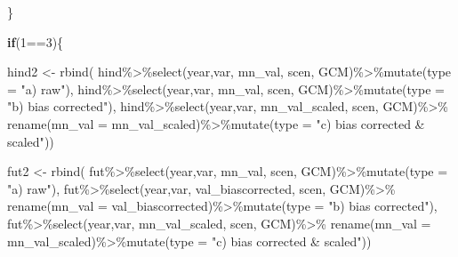 \documentclass[
]{article}
\newenvironment{Shaded}{\begin{snugshade}}{\end{snugshade}}
\newcommand{\AttributeTok}[1]{\textcolor[rgb]{0.77,0.63,0.00}{#1}}
\newcommand{\ControlFlowTok}[1]{\textcolor[rgb]{0.13,0.29,0.53}{\textbf{#1}}}
\newcommand{\DecValTok}[1]{\textcolor[rgb]{0.00,0.00,0.81}{#1}}
\newcommand{\FunctionTok}[1]{\textcolor[rgb]{0.00,0.00,0.00}{#1}}
\newcommand{\NormalTok}[1]{#1}
\newcommand{\OtherTok}[1]{\textcolor[rgb]{0.56,0.35,0.01}{#1}}
\newcommand{\SpecialCharTok}[1]{\textcolor[rgb]{0.00,0.00,0.00}{#1}}
\newcommand{\StringTok}[1]{\textcolor[rgb]{0.31,0.60,0.02}{#1}}
\begin{document}
\begin{Shaded}
\begin{Highlighting}[]
\NormalTok{    \}}
    
    \ControlFlowTok{if}\NormalTok{(}\DecValTok{1}\SpecialCharTok{==}\DecValTok{3}\NormalTok{)\{}
         
\NormalTok{          hind2 }\OtherTok{\textless{}{-}} \FunctionTok{rbind}\NormalTok{(}
\NormalTok{            hind}\SpecialCharTok{\%\textgreater{}\%}\FunctionTok{select}\NormalTok{(year,var, mn\_val, scen, GCM)}\SpecialCharTok{\%\textgreater{}\%}\FunctionTok{mutate}\NormalTok{(}\AttributeTok{type =} \StringTok{"a) raw"}\NormalTok{),}
\NormalTok{            hind}\SpecialCharTok{\%\textgreater{}\%}\FunctionTok{select}\NormalTok{(year,var, mn\_val, scen, GCM)}\SpecialCharTok{\%\textgreater{}\%}\FunctionTok{mutate}\NormalTok{(}\AttributeTok{type =} \StringTok{"b) bias corrected"}\NormalTok{),}
\NormalTok{            hind}\SpecialCharTok{\%\textgreater{}\%}\FunctionTok{select}\NormalTok{(year,var, mn\_val\_scaled, scen, GCM)}\SpecialCharTok{\%\textgreater{}\%}
              \FunctionTok{rename}\NormalTok{(}\AttributeTok{mn\_val =}\NormalTok{ mn\_val\_scaled)}\SpecialCharTok{\%\textgreater{}\%}\FunctionTok{mutate}\NormalTok{(}\AttributeTok{type =} \StringTok{"c) bias corrected \&  scaled"}\NormalTok{))}
          
\NormalTok{          fut2 }\OtherTok{\textless{}{-}} \FunctionTok{rbind}\NormalTok{(}
\NormalTok{            fut}\SpecialCharTok{\%\textgreater{}\%}\FunctionTok{select}\NormalTok{(year,var, mn\_val, scen, GCM)}\SpecialCharTok{\%\textgreater{}\%}\FunctionTok{mutate}\NormalTok{(}\AttributeTok{type =} \StringTok{"a) raw"}\NormalTok{),}
\NormalTok{            fut}\SpecialCharTok{\%\textgreater{}\%}\FunctionTok{select}\NormalTok{(year,var, val\_biascorrected, scen, GCM)}\SpecialCharTok{\%\textgreater{}\%}
              \FunctionTok{rename}\NormalTok{(}\AttributeTok{mn\_val =}\NormalTok{ val\_biascorrected)}\SpecialCharTok{\%\textgreater{}\%}\FunctionTok{mutate}\NormalTok{(}\AttributeTok{type =} \StringTok{"b) bias corrected"}\NormalTok{),}
\NormalTok{            fut}\SpecialCharTok{\%\textgreater{}\%}\FunctionTok{select}\NormalTok{(year,var, mn\_val\_scaled, scen, GCM)}\SpecialCharTok{\%\textgreater{}\%}
              \FunctionTok{rename}\NormalTok{(}\AttributeTok{mn\_val =}\NormalTok{ mn\_val\_scaled)}\SpecialCharTok{\%\textgreater{}\%}\FunctionTok{mutate}\NormalTok{(}\AttributeTok{type =} \StringTok{"c) bias corrected \&  scaled"}\NormalTok{))}
         

\end{Highlighting}
\end{Shaded}
\end{document}

